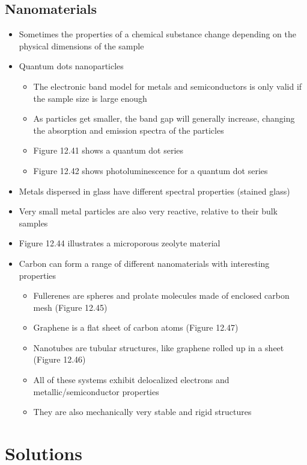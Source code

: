 \documentclass[12pt, openany, letterpaper]{memoir}
\begin{document}
\section{Nanomaterials}
\begin{itemize}
  \item Sometimes the properties of a chemical substance change depending on the physical dimensions of the sample
  \item Quantum dots nanoparticles
  \begin{itemize}
    \item The electronic band model for metals and semiconductors is only valid if the sample size is large enough
    \item As particles get smaller, the band gap will generally increase, changing the absorption and emission spectra of the particles
    \item Figure 12.41 shows a  quantum dot series
    \item Figure 12.42 shows photoluminescence for a  quantum dot series
  \end{itemize}
  \item Metals dispersed in glass have different spectral properties (stained glass)
  \item Very small metal particles are also very reactive, relative to their bulk samples
  \item Figure 12.44 illustrates a microporous zeolyte material
  \item Carbon can form a range of different nanomaterials with interesting properties
  \begin{itemize}
    \item Fullerenes are spheres and prolate molecules made of enclosed carbon mesh (Figure 12.45)
    \item Graphene is a flat sheet of carbon atoms (Figure 12.47)
    \item Nanotubes are tubular structures, like graphene rolled up in a sheet (Figure 12.46)
    \item All of these systems exhibit delocalized electrons and metallic/semiconductor properties
    \item They are also mechanically very stable and rigid structures
  \end{itemize}
\end{itemize}

\chapter{Solutions}
\end{document}
